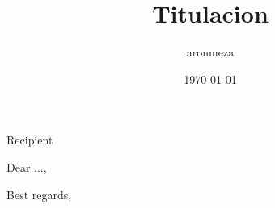 \documentclass[foldmarks=off,fromalign=right,backaddress=false,fromemail=false,fromurl=false,fromlogo=false,fromphone=true]{scrlttr2}
\title{Titulacion}
\author{aronmeza}
\date{\today}
\begin{document}
	\begin{letter}{Recipient}
		\opening{Dear ...,}
		
		\closing{Best regards,}
	\end{letter}
\end{document}
